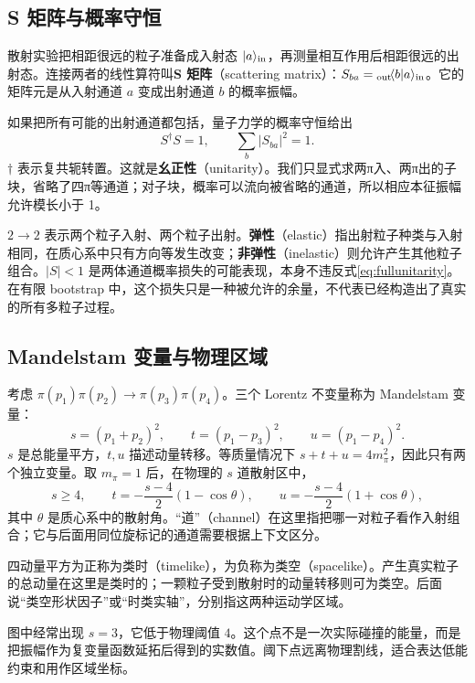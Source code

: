 \documentclass[UTF8,a4paper,11pt,fontset=fandol]{ctexart}
\numberwithin{equation}{section}
\newcommand{\ket}[1]{\lvert #1\rangle}
\begin{document}
\subsection{S 矩阵与概率守恒}
散射实验把相距很远的粒子准备成入射态 \(\ket a_{\rm in}\)，再测量相互作用后相距很远的出射态。连接两者的线性算符叫\textbf{S 矩阵}（scattering matrix）：\(S_{ba}={}_{\rm out}\!\langle b|a\rangle_{\rm in}\)。它的矩阵元是从入射通道 \(a\) 变成出射通道 \(b\) 的概率振幅。

如果把所有可能的出射通道都包括，量子力学的概率守恒给出
\begin{equation}\label{eq:fullunitarity}
S^\dagger S=1,\qquad \sum_b |S_{ba}|^2=1.
\end{equation}
\(\dagger\) 表示复共轭转置。这就是\textbf{幺正性}（unitarity）。我们只显式求两π入、两π出的子块，省略了四π等通道；对子块，概率可以流向被省略的通道，所以相应本征振幅允许模长小于 1。

\(2\to2\) 表示两个粒子入射、两个粒子出射。\textbf{弹性}（elastic）指出射粒子种类与入射相同，在质心系中只有方向等发生改变；\textbf{非弹性}（inelastic）则允许产生其他粒子组合。\(|S|<1\) 是两体通道概率损失的可能表现，本身不违反式\eqref{eq:fullunitarity}。在有限 bootstrap 中，这个损失只是一种被允许的余量，不代表已经构造出了真实的所有多粒子过程。

\subsection{Mandelstam 变量与物理区域}
考虑 \(\pi(p_1)\pi(p_2)\to\pi(p_3)\pi(p_4)\)。三个 Lorentz 不变量称为 Mandelstam 变量：
\begin{equation}
s=(p_1+p_2)^2,\qquad t=(p_1-p_3)^2,\qquad u=(p_1-p_4)^2.
\end{equation}
\(s\) 是总能量平方，\(t,u\) 描述动量转移。等质量情况下 \(s+t+u=4m_\pi^2\)，因此只有两个独立变量。取 \(m_\pi=1\) 后，在物理的 \(s\) 道散射区中，
\begin{equation}\label{eq:kinematics}
s\ge4,\qquad
t=-\frac{s-4}{2}(1-\cos\theta),\qquad
u=-\frac{s-4}{2}(1+\cos\theta),
\end{equation}
其中 \(\theta\) 是质心系中的散射角。“道”（channel）在这里指把哪一对粒子看作入射组合；它与后面用同位旋标记的通道需要根据上下文区分。

四动量平方为正称为类时（timelike），为负称为类空（spacelike）。产生真实粒子的总动量在这里是类时的；一颗粒子受到散射时的动量转移则可为类空。后面说“类空形状因子”或“时类实轴”，分别指这两种运动学区域。

图中经常出现 \(s=3\)，它低于物理阈值 \(4\)。这个点不是一次实际碰撞的能量，而是把振幅作为复变量函数延拓后得到的实数值。阈下点远离物理割线，适合表达低能约束和用作区域坐标。
\end{document}
